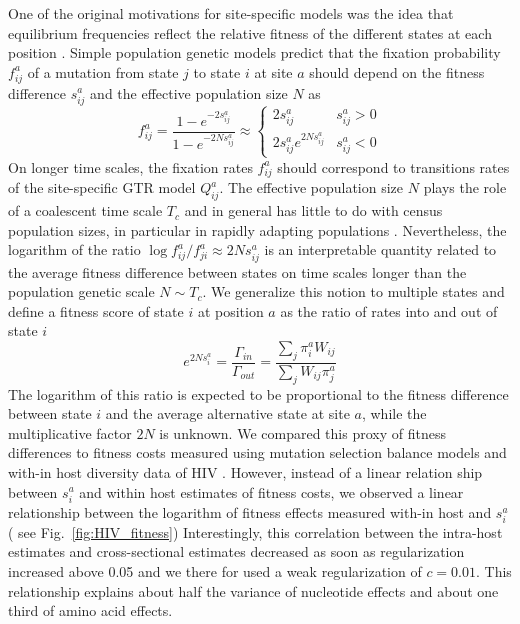 \documentclass[aps,rmp,twocolumn,linenumbers]{revtex4-1}
\newcommand{\pc}{c}
\begin{document}
One of the original motivations for site-specific models was the idea that equilibrium frequencies reflect the relative fitness of the different states at each position \citep{halpern_evolutionary_1998}.
Simple population genetic models predict that the fixation probability $f_{ij}^a$ of a mutation from state $j$ to state $i$ at site $a$ should depend on the fitness difference $s^a_{ij}$ and the effective population size $N$ as \citep{kimura_diffusion_1964}
\begin{equation}
	f^a_{ij} = \frac{1-e^{-2s^a_{ij}}}{1-e^{-2Ns^a_{ij}}} \approx
	\begin{cases}
		2s^a_{ij} & s^a_{ij}>0 \\
		2s^a_{ij} e^{2Ns^a_{ij}} & s^a_{ij} < 0
	\end{cases}
\end{equation}
On longer time scales, the fixation rates $f^a_{ij}$ should correspond to transitions rates of the site-specific GTR model $Q^a_{ij}$.
The effective population size $N$ plays the role of a coalescent time scale $T_c$ and in general has little to do with census population sizes, in particular in rapidly adapting populations \citep{neher_genetic_2013}.
Nevertheless, the logarithm of the ratio $\log f^a_{ij}/f^a_{ji} \approx 2Ns^a_{ij}$ is an interpretable quantity related to the average fitness difference between states on time scales longer than the population genetic scale $N\sim T_c$.
We generalize this notion to multiple states and define a fitness score of state $i$ at position $a$ as the ratio of rates into and out of state $i$
\begin{equation}
	e^{2N s_i^a} = \frac{\Gamma_{in}}{\Gamma_{out}} = \frac{\sum_j \pi_i^a W_{ij}}{\sum_j W_{ij}\pi_j^a}
\end{equation}
The logarithm of this ratio is expected to be proportional to the fitness difference between state $i$ and the average alternative state at site $a$, while the multiplicative factor $2N$ is unknown.
We compared this proxy of fitness differences to fitness costs measured using mutation selection balance models and with-in host diversity data of HIV \citep{zanini2017vivo}.
However, instead of a linear relation ship between $s_i^a$ and within host estimates of fitness costs, we observed a linear relationship between the logarithm of fitness effects measured with-in host and $s_i^a$ (
see Fig.~\ref{fig:HIV_fitness})
Interestingly, this correlation between the intra-host estimates and cross-sectional estimates decreased as soon as regularization increased above 0.05 and we there for used a weak regularization of $\pc=0.01$.
This relationship explains about half the variance of nucleotide effects and about one third of amino acid effects.
\end{document}
